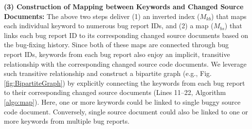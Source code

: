 \documentclass[conference]{IEEEtran}
\begin{document}
\textbf{(3) Construction of Mapping between Keywords and Changed Source Documents:}
The above two steps deliver (1) an inverted index ($M_{kb}$) that maps each individual keyword to numerous bug report IDs, and (2) a map ($M_{bs}$) that links each bug report ID to its corresponding changed source documents based on the bug-fixing history.
Since both of these maps are connected through bug report IDs,
keywords from each bug report also enjoy an implicit, transitive relationship with the corresponding changed source code documents.
We leverage such transitive relationship and construct a bipartite graph (e.g., Fig. \ref{fig:BipartiteGraph}) by explicitly connecting the keywords from each bug report to their corresponding changed source documents (Lines 11--22, Algorithm \ref{algo:map}).
Here, one or more keywords could be linked to single buggy source code document. Conversely, single source document could also be linked to one or more keywords from multiple bug reports. 
\end{document}
